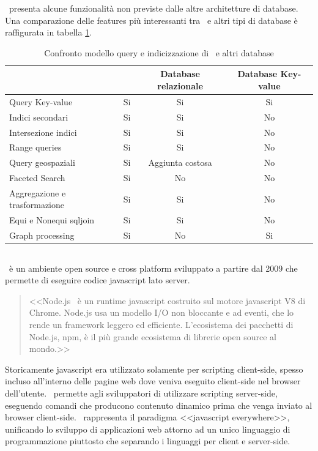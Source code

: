 \noindent
\mongodb~presenta alcune funzionalità non previste dalle altre architetture di database. Una comparazione delle features più interessanti tra \mongodb~e altri tipi di database è raffigurata in tabella \ref{table:mongodbquerymodel}.
\begin{table}[!h]
	\caption{Confronto modello query e indicizzazione di \mongodb~e altri database\cite{mongodbarchitecture}}
	\centering
	\label{table:mongodbquerymodel}
	\begin{tabular}{c c c c}
		  & \mongodb & Database relazionale  & Database Key-value\\ 
		\midrule
		\multicolumn{1}{l}{Query Key-value} & Si & Si  & Si   \\
		\multicolumn{1}{l}{Indici secondari} & Si & Si  & No   \\
		\multicolumn{1}{l}{Intersezione indici} & Si & Si  & No   \\
		\multicolumn{1}{l}{Range queries} & Si & Si  & No   \\
		\multicolumn{1}{l}{Query geospaziali} & Si & Aggiunta costosa  & No   \\
		\multicolumn{1}{l}{Faceted Search} & Si & No  & No   \\
		\multicolumn{1}{l}{Aggregazione e trasformazione} & Si & Si  & No   \\
		\multicolumn{1}{l}{Equi e Nonequi \gls{sqljoin}} & Si & Si  & No   \\
		\multicolumn{1}{l}{Graph processing} & Si & No  & Si   \\
		\bottomrule
	\end{tabular}
\end{table}

\subsection{\nodejs}
\nodejs~è un ambiente open source e cross platform sviluppato a partire dal 2009 che permette di eseguire codice \gls{javascript} lato server.
\begin{quote}
	<<Node.js\textregistered ~ è un runtime \gls{javascript} costruito sul motore \gls{javascript} V8 di Chrome. Node.js usa un modello I/O non bloccante e ad eventi, che lo rende un framework leggero ed efficiente. L'ecosistema dei pacchetti di Node.js, npm, è il più grande ecosistema di librerie open source al mondo.>> \cite{nodejs}
\end{quote}

\noindent
Storicamente \gls{javascript} era utilizzato solamente per scripting client-side, spesso incluso all'interno delle pagine web dove veniva eseguito client-side nel browser dell'utente. \nodejs~permette agli sviluppatori di utilizzare scripting server-side, eseguendo comandi che producono contenuto dinamico prima che venga inviato al browser client-side. \nodejs~rappresenta il paradigma <<\gls{javascript} everywhere>>\cite{jseverywhere}, unificando lo sviluppo di applicazioni web attorno ad un unico linguaggio di programmazione piuttosto che separando i linguaggi per client e server-side.

